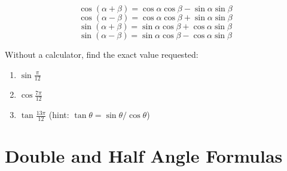 \begin{mdframed}[style=important, frametitle={Sum and Difference Formulas}]
$$\cos{ \left( \alpha + \beta \right)} = \cos{\alpha}\cos{\beta} - \sin{\alpha}\sin{\beta}$$
$$\cos{ \left( \alpha - \beta \right)} = \cos{\alpha}\cos{\beta} + \sin{\alpha}\sin{\beta}$$
$$\sin{ \left( \alpha + \beta \right)} = \sin{\alpha}\cos{\beta} + \cos{\alpha}\sin{\beta}$$
$$\sin{ \left( \alpha - \beta \right)} = \sin{\alpha}\cos{\beta} - \cos{\alpha}\sin{\beta}$$
\end{mdframed}

\begin{Exercise}[label = sum_diff]
Without a calculator, find the exact value requested:
\begin{enumerate}
\item $\sin{\frac{\pi}{12}}$
\item $\cos{\frac{7\pi}{12}}$
\item $\tan{\frac{13\pi}{12}}$ (hint: $\tan{\theta} = \sin{\theta}/\cos{\theta}$)
\end{enumerate}
\end{Exercise}

\section{Double and Half Angle Formulas}